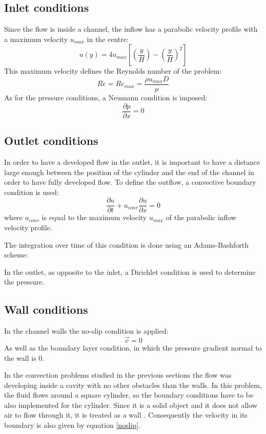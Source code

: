 \subsection{Inlet conditions}
Since the flow is inside a channel, the inflow has a parabolic velocity profile with a maximum velocity $u_{max}$ in the centre:
\begin{equation}
u\left(y\right)=4u_{max}\left[\left(\frac{y}{H}\right)-\left(\frac{y}{H}\right)^{2}\right]
\end{equation}
This maximum velocity defines the Reynolds number of the problem:
\begin{equation}
Re=Re_{max}=\frac{\rho u_{max}D}{\mu}
\end{equation}
As for the pressure conditions, a Neumann condition is imposed:
\begin{equation}
\frac{\partial p}{\partial x}=0
\end{equation}

\subsection{Outlet conditions}
In order to have a developed flow in the outlet, it is important to have a distance large enough between the position of the cylinder and the end of the channel in order to have fully developed flow. To define the outflow, a convective boundary condition is used:
\begin{equation}
\frac{\partial u}{\partial t}+u_{conv}\frac{\partial u}{\partial x}=0
\end{equation}
where $u_{conv}$ is equal to the maximum velocity $u_{max}$ of the parabolic inflow velocity profile.

The integration over time of this condition is done using an Adams-Bashforth scheme:


In the outlet, as opposite to the inlet, a Dirichlet condition is used to determine the pressure.

\subsection{Wall conditions}
In the channel walls the no-slip condition is applied:
\begin{equation}
\vec{v}=0
\label{noslip}
\end{equation}
As well as the boundary layer condition, in which the pressure gradient normal to the wall is 0.

In the convection problems studied in the previous sections the flow was developing inside a cavity with no other obstacles than the walls. In this problem, the fluid flows around a square cylinder, so the boundary conditions have to be also implemented for the cylinder. Since it is a solid object and it does not allow air to flow through it, it is treated as a wall \cite{Ferziger2002}. Consequently the velocity in its boundary is also given by equation \ref{noslip}.

